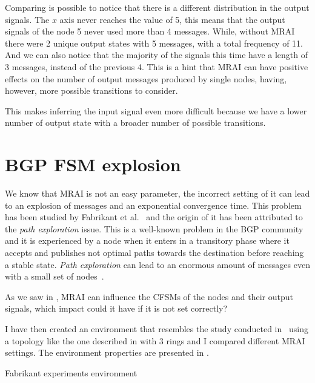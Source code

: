 Comparing  is possible to notice
that there is a different distribution in the output signals.
The $x$ axis never reaches the value of \num{5}, this means that the output signals
of the node \num{5} never used more than \num{4} messages.
While, without \ac{MRAI} there were \num{2} unique output states with \num{5}
messages, with a total frequency of \num{11}.
And we can also notice that the majority of the signals this time have a length
of \num{3} messages, instead of the previous \num{4}.
This is a hint that \ac{MRAI} can have positive effects on the number of output messages
produced by single nodes, having, however, more possible transitions to consider.

This makes inferring the input signal even more difficult because we have a lower
number of output state with a broader number of possible transitions.

\section{BGP FSM explosion}
\label{sec:bgp_fsm_explosion}

We know that \ac{MRAI} is not an easy parameter, the incorrect setting of
it can lead to an explosion of messages and an exponential convergence time.
This problem has been studied by Fabrikant et al.~\cite{fabrikant2011there} and
the origin of it has been attributed to the \textit{path exploration} issue.
This is a well-known problem in the \ac{BGP} community and it is experienced
by a node when it enters in a transitory phase where it accepts and publishes not
optimal paths towards the destination before reaching a stable state.
\textit{Path exploration} can lead to an enormous amount of messages even with
a small set of nodes~\cite{deshpande2004impact}.

As we saw in , \ac{MRAI} can influence the
\ac{CFSM}s of the nodes and their output signals, which impact could it have
if it is not set correctly?

I have then created an environment that resembles the study conducted in~\cite{fabrikant2011there}
using a topology like the one described in 
with \num{3} rings and I compared different \ac{MRAI} settings.
The environment properties are presented in .

\begin{table}[h]
	
	\caption{Fabrikant experiments environment}
	\label{tbl:fabrikant_environment}
\end{table}

